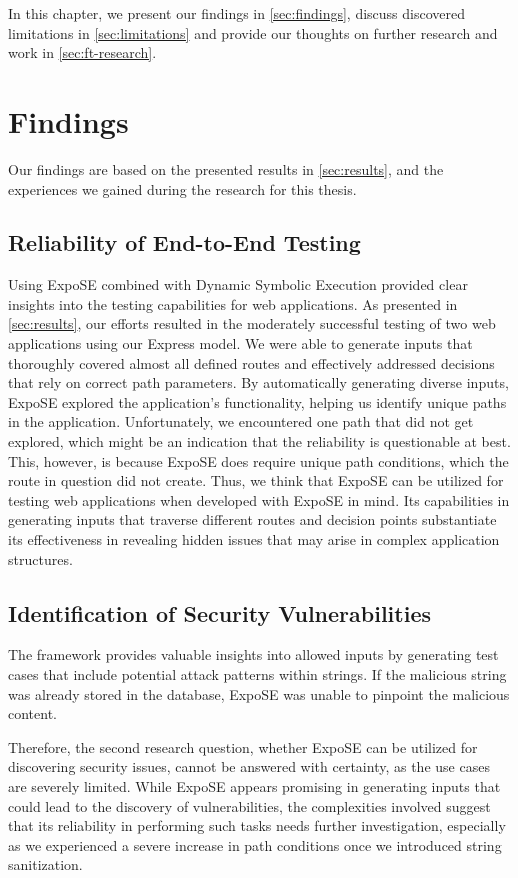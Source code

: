 In this chapter, we present our findings in \autoref{sec:findings}, discuss discovered limitations in \autoref{sec:limitations} and provide our thoughts on further research and work in \autoref{sec:ft-research}.

\section{Findings}
\label{sec:findings}
Our findings are based on the presented results in \autoref{sec:results}, and the experiences we gained during the research for this thesis.

\subsection{Reliability of End-to-End Testing}
Using ExpoSE combined with Dynamic Symbolic Execution provided clear insights into the testing capabilities for web applications. As presented in \autoref{sec:results}, our efforts resulted in the moderately successful testing of two web applications using our Express model. We were able to generate inputs that thoroughly covered almost all defined routes and effectively addressed decisions that rely on correct path parameters. By automatically generating diverse inputs, ExpoSE explored the application's functionality, helping us identify unique paths in the application. Unfortunately, we encountered one path that did not get explored, which might be an indication that the reliability is questionable at best. This, however, is because ExpoSE does require unique path conditions, which the route in question did not create.
Thus, we think that ExpoSE can be utilized for testing web applications when developed with ExpoSE in mind. Its capabilities in generating inputs that traverse different routes and decision points substantiate its effectiveness in revealing hidden issues that may arise in complex application structures. 


\subsection{Identification of Security Vulnerabilities}
The framework provides valuable insights into allowed inputs by generating test cases that include potential attack patterns within strings. If the malicious string was already stored in the database, ExpoSE was unable to pinpoint the malicious content.

Therefore, the second research question, whether ExpoSE can be utilized for discovering security issues, cannot be answered with certainty, as the use cases are severely limited. While ExpoSE appears promising in generating inputs that could lead to the discovery of vulnerabilities, the complexities involved suggest that its reliability in performing such tasks needs further investigation, especially as we experienced a severe increase in path conditions once we introduced string sanitization.


